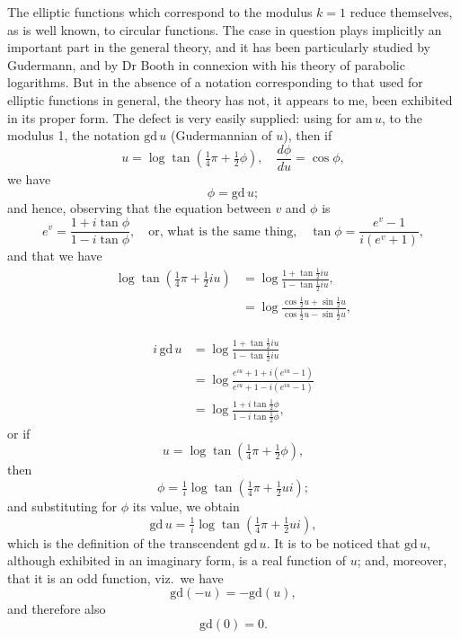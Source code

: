 \documentclass[11pt,a4paper]{article}
\theoremstyle{plain}
\begin{document}
The elliptic functions which correspond to the modulus $k=1$ reduce themselves, as is well known, to circular functions. The case in question plays implicitly an important part in the general theory, and it has been particularly studied by Gudermann, and by Dr Booth in connexion with his theory of parabolic logarithms. But in the absence of a notation corresponding to that used for elliptic functions in general, the theory has not, it appears to me, been exhibited in its proper form. The defect is very easily supplied: using for $\mathrm{am}\, u$, to the modulus 1, the notation $\mathrm{gd}\, u$ (Gudermannian of $u$), then if
\[
u = \log\tan\left(\tfrac{1}{4}\pi + \tfrac{1}{2}\phi\right), \quad \frac{d\phi}{du} = \cos\phi,
\]
we have
\[
\phi = \mathrm{gd}\, u;
\]
and hence, observing that the equation between $v$ and $\phi$ is
\[
e^v = \frac{1 + i\tan\phi}{1 - i\tan\phi}, \quad \text{or, what is the same thing,} \quad \tan\phi = \frac{e^v - 1}{i(e^v + 1)},
\]
and that we have
\begin{align*}
\log\tan\left(\tfrac{1}{4}\pi + \tfrac{1}{2}iu\right) &= \log\frac{1 + \tan\tfrac{1}{2}iu}{1 - \tan\tfrac{1}{2}iu}, \\
&= \log\frac{\cos\tfrac{1}{2}u + \sin\tfrac{1}{2}u}{\cos\tfrac{1}{2}u - \sin\tfrac{1}{2}u},
\end{align*}

\newpage
\begin{align*}
i\,\mathrm{gd}\, u &= \log\frac{1 + \tan\tfrac{1}{2}iu}{1 - \tan\tfrac{1}{2}iu} \\
&= \log\frac{e^{iu} + 1 + i(e^{iu} - 1)}{e^{iu} + 1 - i(e^{iu} - 1)} \\
&= \log\frac{1 + i\tan\tfrac{1}{2}\phi}{1 - i\tan\tfrac{1}{2}\phi},
\end{align*}
or if
\[
u = \log\tan\left(\tfrac{1}{4}\pi + \tfrac{1}{2}\phi\right),
\]
then
\[
\phi = \tfrac{1}{i}\log\tan\left(\tfrac{1}{4}\pi + \tfrac{1}{2}ui\right);
\]
and substituting for $\phi$ its value, we obtain
\[
\mathrm{gd}\, u = \tfrac{1}{i}\log\tan\left(\tfrac{1}{4}\pi + \tfrac{1}{2}ui\right),
\]
which is the definition of the transcendent $\mathrm{gd}\, u$. It is to be noticed that $\mathrm{gd}\, u$, although exhibited in an imaginary form, is a real function of $u$; and, moreover, that it is an odd function, viz.\ we have
\[
\mathrm{gd}(-u) = -\mathrm{gd}(u),
\]
and therefore also
\[
\mathrm{gd}(0) = 0.
\]
\end{document}
